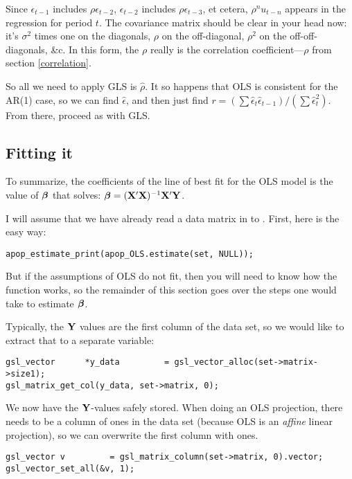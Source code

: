 Since $\epsilon_{t-1}$ includes $\rho\epsilon_{t-2}$, 
$\epsilon_{t-2}$ includes $\rho\epsilon_{t-3}$, et cetera,
$\rho^n u_{t-n}$
appears in the regression for period $t$. The covariance matrix should
be clear in your head now: it's $\sigma^2$ times one on the diagonals,
$\rho$ on the off-diagonal, $\rho^2$ on the off-off-diagonals, \&c. In
this form, the $\rho$ really is the correlation coefficient---$\rho$
from section \ref{correlation}.

So all we need to apply GLS is $\hat\rho$. It so happens that OLS is
consistent for the AR(1) case, so we can find $\hat\epsilon$, and then
just find $r=(\sum \hat\epsilon_t \hat\epsilon_{t-1})/(\sum
\hat\epsilon_t^2)$. From there, proceed as with GLS.


\subsection{Fitting it} 
To summarize,
the coefficients of  the line of best fit for the OLS model is the value of ${\mbox{\boldmath$\beta$}}$ that solves:
$ {\mbox{\boldmath$\beta$}} = ({\bf X}'{\bf X})^{-1}{\bf X}'{\bf Y}$.

I will assume that we have already read a data matrix in to . First, here is the easy way:
\begin{lstlisting}
apop_estimate_print(apop_OLS.estimate(set, NULL));
\end{lstlisting}
But if the assumptions of OLS do not fit, then you will need to know how
the  function works, so the remainder of this
section goes over the steps one would take to estimate ${\mbox{\boldmath$\beta$}}$.  

Typically, the ${\bf Y}$
values are the first column of the data set, so we would like to extract that to a separate variable:
\begin{lstlisting}
gsl_vector      *y_data         = gsl_vector_alloc(set->matrix->size1);
gsl_matrix_get_col(y_data, set->matrix, 0);
\end{lstlisting}

We now have the ${\bf Y}$-values safely stored.  When doing an OLS projection,
there needs to be a column of ones in the data set (because OLS is an
{\sl affine} linear projection), so we can overwrite the first column
with ones. 
\begin{lstlisting}
gsl_vector v         = gsl_matrix_column(set->matrix, 0).vector;
gsl_vector_set_all(&v, 1);  
\end{lstlisting}


